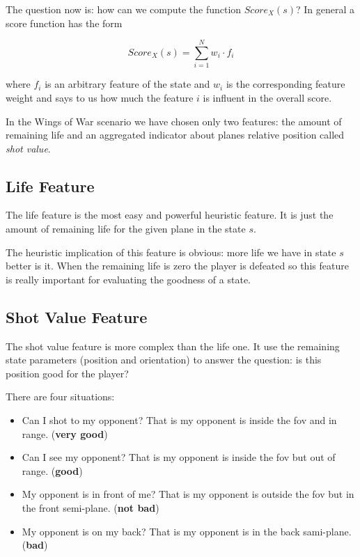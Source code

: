 The question now is: how can we compute the function $Score_X(s)$? In general a score
function has the form

\begin{equation}
  Score_X(s) = \sum_{i=1}^N w_i \cdot f_i
\end{equation}

where $f_i$ is an arbitrary feature of the state and $w_i$ is the corresponding feature
weight and says to us how much the feature $i$ is influent in the overall score.

In the Wings of War scenario we have chosen only two features: the amount of remaining
life and an aggregated indicator about planes relative position called \emph{shot value}.

\subsection{Life Feature}

The life feature is the most easy and powerful heuristic feature. It is just the amount of
remaining life for the given plane in the state $s$.

The heuristic implication of this feature is obvious: more life we have in state $s$
better is it. When the remaining life is zero the player is defeated so this feature is
really important for evaluating the goodness of a state.

\subsection{Shot Value Feature}

The shot value feature is more complex than the life one. It use the remaining state
parameters (position and orientation) to answer the question: is this position good for
the player?

There are four situations:

\begin{itemize}
  \item Can I shot to my opponent? That is my opponent is inside the fov and
    in range. (\textbf{very good})
  \item Can I see my opponent? That is my opponent is inside the fov but out of
    range. (\textbf{good})
  \item My opponent is in front of me? That is my opponent is outside the fov
    but in the front semi-plane. (\textbf{not bad})
  \item My opponent is on my back? That is my opponent is in the back sami-plane.
    (\textbf{bad})
\end{itemize}

